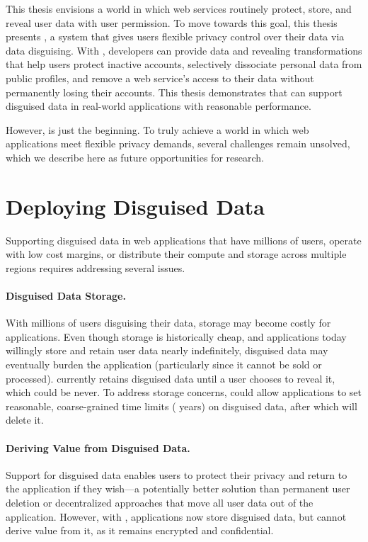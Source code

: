 This thesis envisions a world in which web services routinely
protect, store, and reveal \xxed user data with user permission.
%
To move towards this goal, this thesis presents \sys, a system that gives users 
flexible privacy control over their data via data disguising.
%
With \sys, developers can provide data \xxing and revealing transformations that
help users protect inactive accounts, selectively dissociate personal data from
public profiles, and remove a web service's access to their data without
permanently losing their accounts.
%
This thesis demonstrates that \sys can support disguised data in real-world
applications with reasonable performance.
%

%
However, \sys is just the beginning. To truly achieve a world in which web
applications meet flexible privacy demands, several challenges remain unsolved,
which we describe here as future opportunities for research.
%

\vspace{-3pt}
\section{Deploying Disguised Data}
\label{s:deploying}
Supporting disguised data in web applications that have millions of users,
operate with low cost margins, or distribute their compute and storage
across multiple regions requires addressing several issues.

%
\vspace{-5pt}
\paragraph{Disguised Data Storage.} 
With millions of users disguising their data, storage may become costly for
applications.
%
Even though storage is historically cheap, and applications today willingly
store and retain user data nearly indefinitely, disguised data may eventually
burden the application (particularly since it cannot be sold or processed).
%
\sys currently retains disguised data until a user
chooses to reveal it, which could be never.
%
To address storage concerns, \sys could allow applications to set reasonable,
coarse-grained time limits ( years) on disguised data, after which \sys
will delete it.
%

%
\vspace{-5pt}
\paragraph{Deriving Value from Disguised Data.} 
%
Support for disguised data enables users to protect their privacy and return to
the application if they wish---a potentially better solution than permanent user
deletion or decentralized approaches that move all user data out of the
application. However, with \sys, applications now store disguised data, but
cannot derive value from it, as it remains encrypted and confidential.

